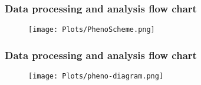 \frame
{
\frametitle{Data processing and analysis flow chart }
\begin{figure} %
   \begin{center}
   \texttt{[image: Plots/PhenoScheme.png]} 
   \end{center}
\end{figure}
}

\frame
{
\frametitle{Data processing and analysis flow chart }
\begin{figure} %
   \begin{center}
   \texttt{[image: Plots/pheno-diagram.png]} 
   \end{center}
\end{figure}
}




